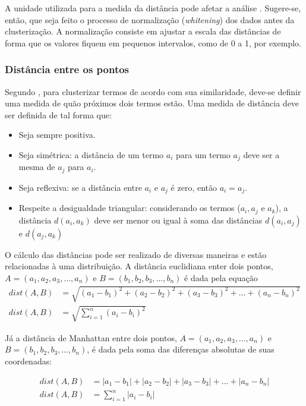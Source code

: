 A unidade utilizada para a medida da distância pode afetar a análise \cite{cole1998}. Sugere-se, então, que seja feito o processo de normalização (\textit{whitening}) dos dados antes da clusterização. A normalização consiste em ajustar a escala das distâncias de forma que os valores fiquem em pequenos intervalos, como de 0 a 1, por exemplo.


\subsubsection{Distância entre os pontos}
\label{ssub:distância_entre_os_pontos}

Segundo , para clusterizar termos de acordo com sua similaridade, deve-se definir uma medida de quão próximos dois termos estão. Uma medida de distância deve ser definida de tal forma que:

\begin{itemize}
  \item Seja sempre positiva.
  \item Seja simétrica: a distância de um termo \(a_i\) para um termo \(a_j\) deve ser a mesma de \(a_j\) para \(a_i\).
  \item Seja reflexiva: se a distância entre \(a_i\) e \(a_j\) é zero, então \(a_i = a_j\).
  \item Respeite a desigualdade triangular: considerando os termos (\(a_i, a_j\) e \(a_k\)), a distância \(d(a_i, a_k)\) deve ser menor ou igual à soma das distâncias \(d(a_i, a_j)\) e \(d(a_j, a_k)\)
\end{itemize}

O cálculo das distâncias pode ser realizado de diversas maneiras e estão relacionadas à uma distribuição. A distância euclidiana enter dois pontos,  \(A=(a_1, a_2, a_3, \ldots, a_n) \) e \(B=(b_1, b_2, b_3, \ldots, b_n) \) é dada pela equação
%
\begin{align}
  dist(A, B) &= \sqrt{(a_1-b_1)^2+(a_2-b_2)^2+(a_3-b_3)^2+\ldots+(a_n-b_n)^2} \\
  dist(A, B) &= \sqrt{\displaystyle\sum_{i=1}^{n} (a_i-b_i)^2} \label{eq:euclidean}
\end{align}

Já a distância de Manhattan entre dois pontos, \(A=(a_1, a_2, a_3, \ldots, a_n) \) e \(B=(b_1, b_2, b_3, \ldots, b_n) \), é dada pela soma das diferenças absolutas de suas coordenadas:

\begin{align}
  dist(A, B) &= |a_1-b_1|+|a_2-b_2|+|a_3-b_3|+\ldots+|a_n-b_n| \\
  dist(A, B) &= \displaystyle\sum_{i=1}^{n} |a_i-b_i| \label{eq:manhattan}
\end{align}


